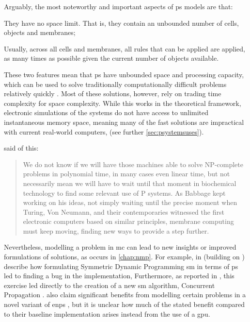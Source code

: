 Arguably, the most noteworthy and important aspects of \gls{ps} models are that:
\begin{inparaenum}[(i)]
\item They have no space limit.  That is, they contain an unbounded number of cells, objects and membranes;
\item Usually, across all cells and membranes, all rules that can be applied are applied, as many times as possible given the current number of objects available.
\end{inparaenum}
These two features mean that \gls{ps} have unbounded space and processing capacity, which can be used to solve traditionally computationally difficult problems relatively quickly \cite{Sosik2003,Jimenez2003,Paun1999a,Henderson2020}.  Most of these solutions, however, rely on trading time complexity for space complexity.  While this works in the theoretical framework, electronic simulations of the systems do not have access to unlimited instantaneous memory space, meaning many of the fast solutions are impractical with current real-world computers, \eg{} \cite{Cooper2019,Cooper2019a} \fxnote[inline]{[refs]} (see further \vref{sec:psystemsuses}).

\citeauthor{Valencia-Cabrera2019} said of this:
\blockcquote[][p.~213]{Valencia-Cabrera2019}{We do not know if we will have those machines able to solve NP-complete problems in polynomial time, in many cases even linear time, but  not necessarily mean we will have to wait until that moment in biochemical technology to find some relevant use of P systems. As Babbage kept working on his ideas, not simply waiting until the precise moment when Turing, Von Neumann, and their contemporaries witnessed the first electronic computers based on similar principles, membrane computing must keep moving, finding new ways to provide a step further.}

Nevertheless, modelling a problem in \gls{mc} can lead to new insights or improved formulations of solutions, as occurs in \cref{chap:nmp}.  For example, in \cite{GimelFarb2013a} (building on \cite{Gimelfarb2011}) \citeauthor{GimelFarb2013a} describe how formulating Symmetric Dynamic Programming \gls{sm} in terms of \gls{ps} led to finding a bug in the implementation,   Furthermore, as reported in \cite{Nicolescu2014b}, this exercise led directly to the creation of a new \gls{sm} algorithm, Concurrent Propagation \cite{Gimelfarb2012}.  \citeauthor{Pang2018} \cite{Pang2018} also claim significant benefits from modelling certain problems in a novel variant of \gls{enps} \cite{Pavel2010}, but it is unclear how much of the stated benefit compared to their baseline implementation arises instead from the use of a \gls{gpu}.

